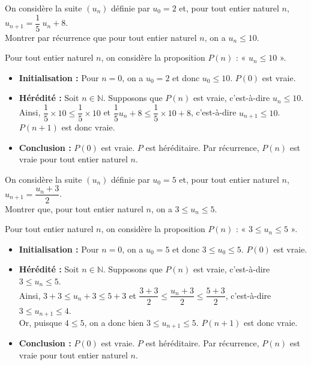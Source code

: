 \documentclass[11pt,fleqn]{book} %
\begin{document}
\begin{exercise}
On considère la suite $(u_n)$ définie par $u_0=2$ et, pour tout entier naturel $n$, $u_{n+1}=\dfrac{1}{5}\ u_n + 8$. \\ Montrer par récurrence que pour tout entier naturel $n$, on a $u_n \leqslant 10$.\end{exercise}

\begin{solution}Pour tout entier naturel $n$, on considère la proposition $P(n)$ : « $u_n\leqslant 10$ ».
\begin{itemize}
\item \textbf{Initialisation :} Pour $n=0$, on a $u_0=2$ et donc $u_0\leqslant 10$. $P(0)$ est vraie.
\item \textbf{Hérédité :} Soit $n\in\mathbb{N}$. Supposons que $P(n)$ est vraie, c'est-à-dire $u_n\leqslant 10$. Ainsi, $\dfrac{1}{5} \times 10 \leqslant \dfrac{1}{5} \times 10$ et $\dfrac{1}{5}u_n+8 \leqslant \dfrac{1}{5} \times 10 + 8$, c'est-à-dire $u_{n+1}\leqslant10$. $P(n+1)$ est donc vraie.
\item \textbf{Conclusion :} $P(0)$ est vraie. $P$ est héréditaire. Par récurrence, $P(n)$ est vraie pour tout entier naturel $n$.
\end{itemize}\end{solution}

\begin{exercise}
On considère la suite $(u_n)$ définie par $u_0=5$ et, pour tout entier naturel $n$, $u_{n+1}=\dfrac{u_n+3}{2}$. \\ Montrer que, pour tout entier naturel $n$, on a $3 \leqslant u_n \leqslant 5$.\end{exercise}


\begin{solution}Pour tout entier naturel $n$, on considère la proposition $P(n)$ : « $3 \leqslant u_n \leqslant 5$ ».
\begin{itemize}
\item \textbf{Initialisation :} Pour $n=0$, on a $u_0=5$ et donc $3\leqslant u_0\leqslant 5$. $P(0)$ est vraie.
\item \textbf{Hérédité :} Soit $n\in\mathbb{N}$. Supposons que $P(n)$ est vraie, c'est-à-dire $3 \leqslant u_n \leqslant 5$. \\Ainsi, $3+3 \leqslant u_n+3 \leqslant 5+3$ et $\dfrac{3+3}{2} \leqslant \dfrac{u_n+3}{2} \leqslant \dfrac{5+3}{2}$, c'est-à-dire $3 \leqslant u_{n+1} \leqslant 4$.\\ Or, puisque $4 \leqslant 5$, on a donc bien $3\leqslant u_{n+1} \leqslant 5$. $P(n+1)$ est donc vraie.
\item \textbf{Conclusion :} $P(0)$ est vraie. $P$ est héréditaire. Par récurrence, $P(n)$ est vraie pour tout entier naturel $n$.
\end{itemize}\end{solution}
\end{document}
